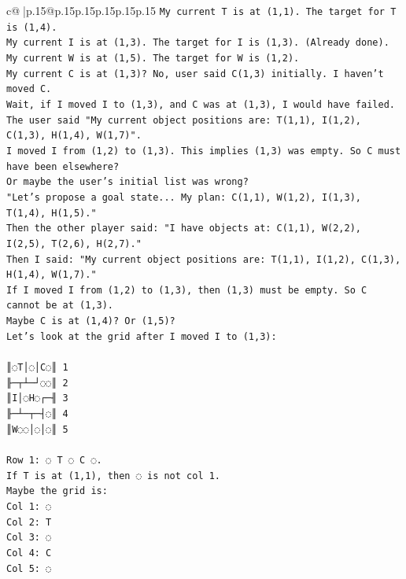 \documentclass{article}
\begin{document}
{\begin{supertabular}{c@{$\;$}|p{.15\linewidth}@{}p{.15\linewidth}p{.15\linewidth}p{.15\linewidth}p{.15\linewidth}p{.15\linewidth}}
{{{\texttt{My current T is at (1,1). The target for T is (1,4).} \\
\texttt{My current I is at (1,3). The target for I is (1,3). (Already done).} \\
\texttt{My current W is at (1,5). The target for W is (1,2).} \\
\texttt{My current C is at (1,3)? No, user said C(1,3) initially. I haven't moved C.} \\
\texttt{Wait, if I moved I to (1,3), and C was at (1,3), I would have failed.} \\
\texttt{The user said "My current object positions are: T(1,1), I(1,2), C(1,3), H(1,4), W(1,7)".} \\
\texttt{I moved I from (1,2) to (1,3). This implies (1,3) was empty. So C must have been elsewhere?} \\
\texttt{Or maybe the user's initial list was wrong?} \\
\texttt{"Let's propose a goal state... My plan: C(1,1), W(1,2), I(1,3), T(1,4), H(1,5)."} \\
\texttt{Then the other player said: "I have objects at: C(1,1), W(2,2), I(2,5), T(2,6), H(2,7)."} \\
\texttt{Then I said: "My current object positions are: T(1,1), I(1,2), C(1,3), H(1,4), W(1,7)."} \\
\texttt{If I moved I from (1,2) to (1,3), then (1,3) must be empty. So C cannot be at (1,3).} \\
\texttt{Maybe C is at (1,4)? Or (1,5)?} \\
\texttt{Let's look at the grid after I moved I to (1,3):} \\
\\ 
\texttt{║◌T│◌│C◌║ 1} \\
\texttt{╟─┬┴─┘◌◌║ 2} \\
\texttt{║I│◌H◌┌─╢ 3} \\
\texttt{╟─┴─┬─┤◌║ 4} \\
\texttt{║W◌◌│◌│◌║ 5} \\
\\ 
\texttt{Row 1: ◌ T ◌ C ◌.} \\
\texttt{If T is at (1,1), then ◌ is not col 1.} \\
\texttt{Maybe the grid is:} \\
\texttt{Col 1: ◌} \\
\texttt{Col 2: T} \\
\texttt{Col 3: ◌} \\
\texttt{Col 4: C} \\
\texttt{Col 5: ◌} \\
}}}
\end{supertabular}}
\end{document}
